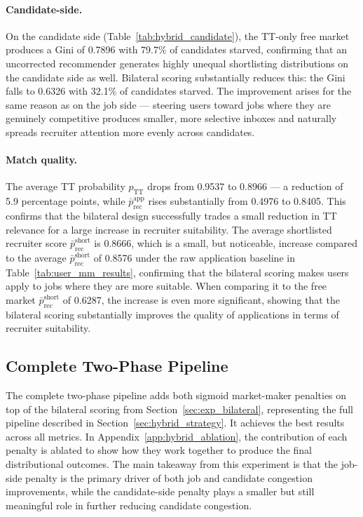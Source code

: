 \paragraph{Candidate-side.}
On the candidate side (Table~\ref{tab:hybrid_candidate}), the TT-only
free market produces a Gini of 0.7896 with 79.7\% of candidates
starved, confirming that an uncorrected recommender generates highly
unequal shortlisting distributions on the candidate side as well. Bilateral scoring substantially reduces this: the Gini falls to 0.6326
with 32.1\% of candidates starved. The improvement arises for the same
reason as on the job side --- steering users toward jobs where they are
genuinely competitive produces smaller, more selective inboxes and
naturally spreads recruiter attention more evenly across candidates.

\paragraph{Match quality.}
The average \gls{TT} probability $p_{\text{TT}}$ drops from 0.9537 to 0.8966 --- a reduction 
of 5.9 percentage points, while $\bar{p}_{\text{rec}}^{\text{app}}$ rises substantially 
from 0.4976 to 0.8405. This confirms that the bilateral design successfully trades a small reduction in \gls{TT} relevance for a large increase in recruiter suitability. The average shortlisted recruiter score $\bar{p}_{\text{rec}}^{\text{short}}$ is 0.8666, which is a small, but noticeable, increase compared to the average $\bar{p}_{\text{rec}}^{\text{short}}$ of 0.8576 under the raw application baseline in Table~\ref{tab:user_mm_results}, confirming that the bilateral scoring makes users apply to jobs where they are more suitable. When comparing it to the free market $\bar{p}_{\text{rec}}^{\text{short}}$ of 0.6287, the increase is even more significant, showing that the bilateral scoring substantially improves the quality of applications in terms of recruiter suitability.
 
\subsection{Complete Two-Phase Pipeline}
\label{sec:exp_hybrid_results}
 
The complete two-phase pipeline adds both sigmoid market-maker penalties on top of the
bilateral scoring from Section~\ref{sec:exp_bilateral}, representing
the full pipeline described in Section~\ref{sec:hybrid_strategy}. It
achieves the best results across all metrics. In Appendix~\ref{app:hybrid_ablation}, the contribution of each penalty is ablated to show how they work together to produce the final distributional outcomes. The main takeaway from this experiment is that the job-side penalty is the primary driver of both job and candidate congestion improvements, while the candidate-side penalty plays a smaller but still meaningful role in further reducing candidate congestion. 
 
